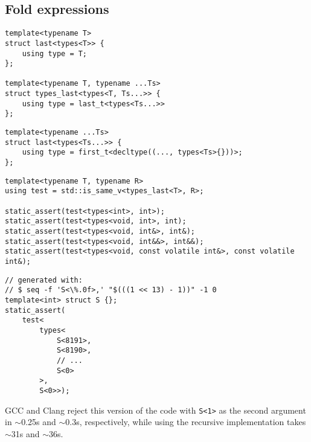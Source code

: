 \subsection{Fold expressions}

\begin{lstlisting}[style=c++]
template<typename T>
struct last<types<T>> {
    using type = T;
};

template<typename T, typename ...Ts>
struct types_last<types<T, Ts...>> {
    using type = last_t<types<Ts...>>
};
\end{lstlisting}

\begin{lstlisting}[style=c++]
template<typename ...Ts>
struct last<types<Ts...>> {
    using type = first_t<decltype((..., types<Ts>{}))>;
};
\end{lstlisting}

\begin{lstlisting}[style=c++]
template<typename T, typename R>
using test = std::is_same_v<types_last<T>, R>;

static_assert(test<types<int>, int>);
static_assert(test<types<void, int>, int);
static_assert(test<types<void, int&>, int&);
static_assert(test<types<void, int&&>, int&&);
static_assert(test<types<void, const volatile int&>, const volatile int&);
\end{lstlisting}

\begin{lstlisting}[style=c++]
// generated with:
// $ seq -f 'S<\%.0f>,' "$(((1 << 13) - 1))" -1 0
template<int> struct S {};
static_assert(
    test<
        types<
            S<8191>,
            S<8190>,
            // ...
            S<0>
        >,
        S<0>>);
\end{lstlisting}

GCC and Clang reject this version of the code with \texttt{S<1>} as the second
argument in $\sim$0.25s and $\sim$0.3s, respectively\footnotemark, while using
the recursive implementation takes $\sim$31s and $\sim$36s.

